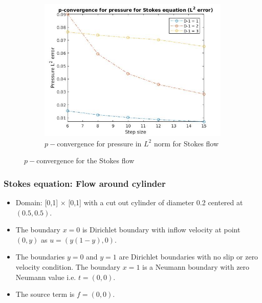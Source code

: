 \documentclass{beamer}
\begin{document}
\begin{frame}
\begin{figure}
\begin{subfigure}{0.3\textwidth}
\centering
  \includegraphics[width=\linewidth]{p_conv_pressure_l2_stokes.jpg}
  \caption{$p-$convergence for pressure in $L^2$ norm for Stokes flow}
  \label{p_convergence_pressure_l2}
\end{subfigure}
\caption{$p-$convergence for the Stokes flow}
\label{p_conv_stokes_flow}
\end{figure}
\end{frame}
\begin{frame}
\frametitle{Stokes equation: Flow around cylinder}
\begin{itemize}
\item Domain: [0,1] $\times$ [0,1] with a cut out cylinder of diameter 0.2 centered at $(0.5,0.5)$.
\item The boundary ${x=0}$ is Dirichlet boundary with inflow velocity at point $(0,y)$ as $u = (y(1-y), 0)$. 
\item The boundaries ${y = 0}$ and ${y = 1}$ are Dirichlet boundaries with no slip or zero velocity condition. The boundary ${x = 1}$ is a Neumann boundary with zero Neumann value i.e. $t = (0, 0)$. 
\item The source term is $f = (0, 0)$.
\end{itemize}
\end{frame}
\end{document}
